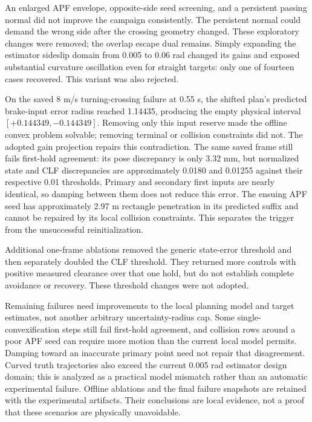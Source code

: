 \documentclass[11pt]{article}
\begin{document}
An enlarged APF envelope, opposite-side seed screening, and a persistent
passing normal did not improve the campaign consistently. The persistent
normal could demand the wrong side after the crossing geometry changed.
These exploratory changes were removed; the overlap escape dual remains.
Simply expanding the estimator sideslip domain from 0.005 to 0.06 rad
changed its gains and exposed substantial curvature oscillation even for
straight targets: only one of fourteen cases recovered. This variant was
also rejected.

On the saved 8 m/s turning-crossing failure at 0.55 s, the shifted plan's
predicted brake-input error radius reached 1.14435, producing the empty
physical interval $[+0.144349,-0.144349]$. Removing only this input reserve
made the offline convex problem solvable; removing terminal or collision
constraints did not. The adopted gain projection repairs this contradiction.
The same saved frame still fails first-hold agreement: its pose discrepancy
is only 3.32 mm, but normalized state and CLF discrepancies are approximately
0.0180 and 0.01255 against their respective 0.01 thresholds. Primary and
secondary first inputs are nearly identical, so damping between them does
not reduce this error. The ensuing APF seed has approximately 2.97 m
rectangle penetration in its predicted suffix and cannot be repaired by
its local collision constraints. This separates the trigger from the
unsuccessful reinitialization.

Additional one-frame ablations removed the generic state-error threshold
and then separately doubled the CLF threshold. They returned more controls
with positive measured clearance over that one hold, but do not establish
complete avoidance or recovery. These threshold changes were not adopted.

Remaining failures need improvements to the local planning model and
target estimates, not another arbitrary uncertainty-radius cap. Some
single-convexification steps still fail first-hold agreement, and collision
rows around a poor APF seed can require more motion than the current local
model permits. Damping toward an inaccurate primary point need not repair
that disagreement. Curved truth trajectories also exceed the current
0.005 rad estimator design domain; this is analyzed as a practical model
mismatch rather than an automatic experimental failure.
Offline ablations and the final failure snapshots are retained with the
experimental artifacts. Their conclusions are local evidence, not a proof
that these scenarios are physically unavoidable.
\end{document}
